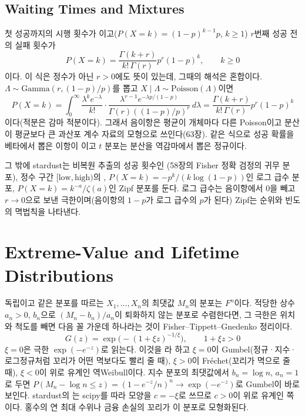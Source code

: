 \subsection{Waiting Times and Mixtures}

첫 성공까지의 시행 횟수가 이고($P(X=k)=(1-p)^{k-1}p$, $k\ge1$) $r$번째 성공 전의 실패 횟수가 
\[
P(X=k)=\frac{\Gamma(k+r)}{k!\,\Gamma(r)}p^r(1-p)^k,\qquad k\ge0
\]
이다. 이 식은 정수가 아닌 $r>0$에도 뜻이 있는데, 그때의 해석은 혼합이다. $\Lambda\sim\mathrm{Gamma}(r,(1-p)/p)$를 뽑고 $X\mid\Lambda\sim\mathrm{Poisson}(\Lambda)$이면
\[
P(X=k)=\int_0^\infty\frac{\lambda^ke^{-\lambda}}{k!}\cdot\frac{\lambda^{r-1}e^{-\lambda p/(1-p)}}{\Gamma(r)((1-p)/p)^r}\,d\lambda=\frac{\Gamma(k+r)}{k!\,\Gamma(r)}p^r(1-p)^k
\]
이다(적분은 감마 적분이다). 그래서 음이항은 평균이 개체마다 다른 Poisson이고 분산이 평균보다 큰 과산포 계수 자료의 모형으로 쓰인다(63장). 같은 식으로 성공 확률을 베타에서 뽑은 이항이 이고 $t$ 분포는 분산을 역감마에서 뽑은 정규이다.

그 밖에 stardust는 비복원 추출의 성공 횟수인 (58장의 Fisher 정확 검정의 귀무 분포), 정수 구간 $[\text{low},\text{high})$의 , $P(X=k)=-p^k/(k\log(1-p))$인 로그 급수 분포, $P(X=k)=k^{-a}/\zeta(a)$인 Zipf 분포를 둔다. 로그 급수는 음이항에서 $0$을 빼고 $r\to0$으로 보낸 극한이며(음이항의 $1-p$가 로그 급수의 $p$가 된다) Zipf는 순위와 빈도의 멱법칙을 나타낸다.

\section{Extreme-Value and Lifetime Distributions}
\label{sec:extreme-value}

독립이고 같은 분포를 따르는 $X_1,\dots,X_n$의 최댓값 $M_n$의 분포는 $F^n$이다. 적당한 상수 $a_n>0$, $b_n$으로 $(M_n-b_n)/a_n$이 퇴화하지 않는 분포로 수렴한다면, 그 극한은 위치와 척도를 빼면 다음 꼴 가운데 하나라는 것이 Fisher--Tippett--Gnedenko 정리이다\cite{fisher1928extreme,gnedenko1943}.
\[
G(z)=\exp\bigl(-(1+\xi z)^{-1/\xi}\bigr),\qquad1+\xi z>0
\]
$\xi=0$은 극한 $\exp(-e^{-z})$로 읽는다. 이것을 라 하고 $\xi=0$이 Gumbel(정규·지수·로그정규처럼 꼬리가 어떤 멱보다도 빨리 줄 때), $\xi>0$이 Fréchet(꼬리가 멱으로 줄 때), $\xi<0$이 위로 유계인 역Weibull이다. 지수 분포의 최댓값에서 $b_n=\log n$, $a_n=1$로 두면 $P(M_n-\log n\le z)=(1-e^{-z}/n)^n\to\exp(-e^{-z})$로 Gumbel이 바로 보인다. stardust의 는 scipy를 따라 모양을 $c=-\xi$로 쓰므로 $c>0$이 위로 유계인 쪽이다. 홍수의 연 최대 수위나 금융 손실의 꼬리가 이 분포로 모형화된다.

